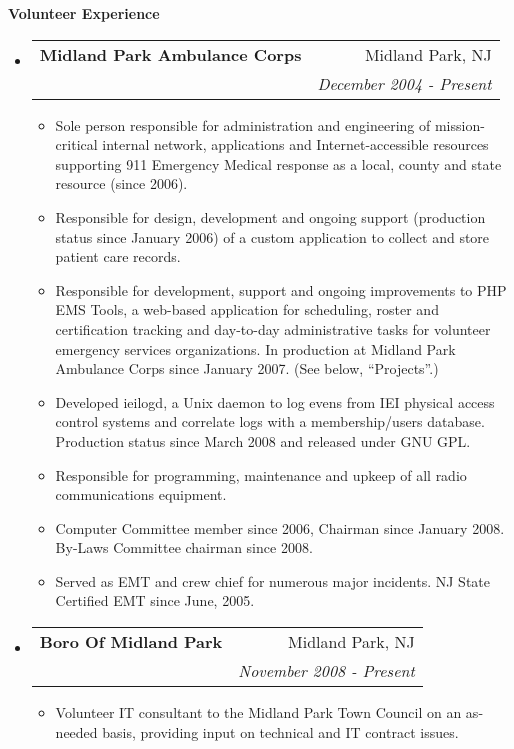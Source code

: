 \documentclass[letterpaper,11pt]{article}
\makeatletter
\newcommand{\resitem}[1]{\item #1 \vspace{-2pt}}
\newcommand{\resheading}[1]{{\large \colorbox{mygrey}{\begin{minipage}{\textwidth}{\textbf{#1 \vphantom{p\^{E}}}}\end{minipage}}}}
\newcommand{\ressubheading}[4]{
\begin{tabular*}{7.0in}{l@{\extracolsep{\fill}}r}
		\textbf{#1} & #2 \\
		\textit{#3} & \textit{#4} \\
\end{tabular*}\vspace{-6pt}}
\makeatother
\begin{document}
\resheading{Volunteer Experience}
\begin{itemize}
\item
        \ressubheading{Midland Park Ambulance Corps}{Midland Park, NJ}{ }{December 2004 - Present}
        \begin{itemize}
                \resitem{Sole person responsible for administration and engineering of
                  mission-critical internal network, applications and
                  Internet-accessible resources supporting 911 Emergency
                  Medical response as a local, county and state resource
                  (since 2006).}
                \resitem{Responsible for design, development and ongoing support (production
                  status since January 2006) of a custom application to collect and store patient care records.}
                \resitem{Responsible for development, support and ongoing
                  improvements to PHP EMS Tools, a web-based application for
                  scheduling, roster and certification tracking and day-to-day
                administrative tasks for volunteer emergency services
                organizations. In production at Midland Park Ambulance Corps
                since January 2007. (See below, ``Projects''.)}
                \resitem{Developed ieilogd, a Unix daemon to log evens from
                  IEI physical access control systems and correlate logs with
                  a membership/users database. Production status since March
                  2008 and released under GNU GPL.}
                \resitem{Responsible for programming, maintenance and upkeep
                  of all radio communications equipment.}
                \resitem{Computer Committee member since 2006, Chairman since
                  January 2008. By-Laws Committee chairman since 2008.}
                \resitem{Served as EMT and crew chief for numerous major
                  incidents. NJ State Certified EMT since June, 2005.}
        \end{itemize}

\item
        \ressubheading{Boro Of Midland Park}{Midland Park, NJ}{}{November 2008 - Present}
        \begin{itemize}
                \resitem{Volunteer IT consultant to the Midland Park Town
                  Council on an as-needed basis, providing input on technical
                  and IT contract issues.}
        \end{itemize}
\end{itemize}
\end{document}
